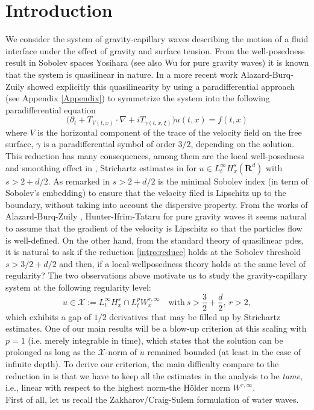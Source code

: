 \documentclass[11pt,english]{smfart}
\theoremstyle{plain}
\theoremstyle{definition}
\numberwithin{equation}{section}
\begin{document}
\section{Introduction}
{\hspace*{.15in}} We consider the system of gravity-capillary waves describing the motion of a fluid interface under the effect of gravity and surface tension. From the well-posedness result in Sobolev spaces  Yosihara \cite{Yosihara} (see also Wu \cite{WuInvent, WuJAMS} for pure gravity waves) it is known that the system is quasilinear in nature. In a more recent work \cite{ABZ1} Alazard-Burq-Zuily showed explicitly this quasilinearity by using a paradifferential approach (see Appendix \ref{Appendix}) to symmetrize the system into the following paradifferential equation
\begin{equation}\label{intro:reduce}
\big(\partial_t +T_{V(t, x)}\cdot\nabla +iT_{\gamma(t, x, \xi)} \big) u(t,x)=f(t,x)
\end{equation}
where $V$ is the horizontal component of the trace of the velocity field on the free surface, $\gamma$ is a paradifferential symbol of order $3/2$, depending on the solution. This reduction has many consequences, among them are the local well-posedness and smoothing effect in \cite{ABZ1}, Strichartz estimates in \cite{ABZ2}  for $u\in L^\infty_tH_x^s({\mathbf{R}}^d)$ with $s>2+d/2$. As remarked in \cite{ABZ1} $s>2+d/2$ is the minimal Sobolev index (in term of Sobolev's embedding) to ensure that the velocity filed is Lipschitz up to the boundary, without taking into account the dispersive property.  From the works of Alazard-Burq-Zuily \cite{ABZ3, ABZ4},  Hunter-Ifrim-Tataru \cite{HuIfTa} for pure gravity waves it seems natural to assume that the gradient of the velocity is Lipschitz so that the particles flow is well-defined. On the other hand, from the standard theory of quasilinear pdes, it is natural to ask if the reduction \eqref{intro:reduce} holds at the Sobolev threshold $s>3/2+d/2$ and then, if a local-wellposedness theory holds at the same level of regularity?  The two observations above motivate us to study the gravity-capillary system at the following regularity level: 
\begin{equation}\label{intro:reg}
u\in \mathcal{X}:=L^\infty_tH^s_x\cap L^p_tW^{r, \infty}_x \quad\text{with}~
s>\frac{3}{2}+\frac{d}{2},~r>2,
\end{equation}
which exhibits a gap of $1/2$ derivatives that may be filled up by Strichartz estimates. One of our main results will be a blow-up criterion at this scaling with $p=1$ (i.e. merely integrable in time), which states that the solution can be prolonged as long as the $\mathcal{X}$-norm of $u$  remained bounded (at least in the case of infinite depth). To derive our criterion, the main difficulty compare to the reduction in \cite{ABZ1} is that we have to keep all the estimates in the analysis to be {\it tame}, i.e., linear with respect to the highest norm-the H\"older norm $W^{r,\infty}$.\\
{\hspace*{.15in}} First of all, let us recall the Zakharov/Craig-Sulem formulation of water waves.
\end{document}
